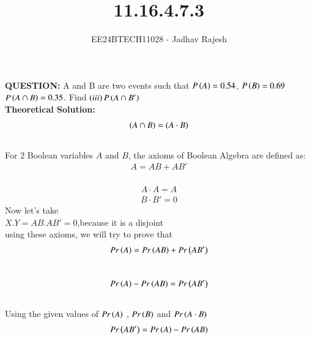\documentclass[journal]{IEEEtran}
\begin{document}

\vspace{3cm}
\title{11.16.4.7.3}
\author{EE24BTECH11028 - Jadhav Rajesh}
{\let\newpage\relax\maketitle}

\renewcommand{\thefigure}{\theenumi}
\renewcommand{\thetable}{\theenumi}
\setlength{\intextsep}{10pt} %


\renewcommand{\thetable}{\theenumi}
 \textbf{QUESTION:} A and B are two events such that $P\left(A\right)=0.54$, $P\left(B\right)=0.69$ $P\left(A \cap B\right)=0.35$. Find $\left(iii\right)P\left(A \cap B'\right)$\\
\textbf{Theoretical Solution:\\}
\begin{align}
 \left(A \cap B\right)=\left(A\cdot B\right)
\end{align}\\
For 2 Boolean variables $A$ and $B$, the axioms of Boolean Algebra are defined as:
\begin{align}
    A=AB+AB'
\end{align}\\
\begin{align}
    A\cdot A = A
\end{align}
\begin{align}
    B \cdot B' = 0
\end{align}
Now let's take\\
    $X.Y= AB.AB'=0$,because it is a disjoint\\
 using these axioms, we will try to prove that\\
 \begin{align}
     Pr\left(A\right)=Pr\left(AB\right)+Pr\left(AB'\right)
 \end{align}\\
 \begin{align}
     Pr\left(A\right) -Pr\left(AB\right) = Pr\left(AB'\right)
 \end{align}\\
 Using the given values of $Pr\left(A\right)$ , $Pr\left(B\right)$ and $Pr\left(A\cdot B\right)$\\
 \begin{align}
           Pr\left(AB'\right) = Pr\left(A\right) -Pr\left(AB\right)
 \end{align}\\
\end{document}
